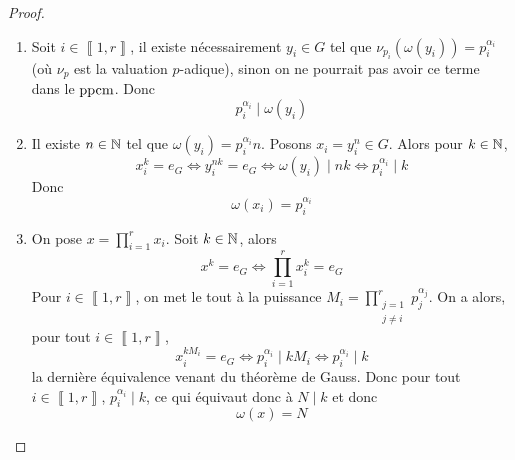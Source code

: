 \begin{proof}
	\phantom{}
	\begin{enumerate}
		\item Soit $i\in\left\llbracket 1,r\right\rrbracket$, il existe nécessairement $y_{i}\in G$ tel que $\nu_{p_{i}}(\omega(y_{i}))=p_{i}^{\alpha_{i}}$ (où $\nu_{p}$ est la valuation $p$-adique), sinon on ne pourrait pas avoir ce terme dans le $\operatorname{ppcm}$. Donc 
		\begin{equation}
			\boxed{p_{i}^{\alpha_{i}}\mid \omega(y_{i})}
		\end{equation}
		
		\item Il existe $n\in\mathbb{N}$ tel que $\omega(y_{i})=p_{i}^{\alpha_{i}}n$. Posons $x_{i}=y_{i}^{n}\in G$. Alors pour $k\in\mathbb{N}$,
		\begin{equation}
			x_{i}^{k}=e_{G}\Longleftrightarrow y_{i}^{nk}=e_{G}\Longleftrightarrow \omega(y_{i})\mid nk\Longleftrightarrow p_{i}^{\alpha_{i}}\mid k
		\end{equation}
		Donc 
		\begin{equation}
			\boxed{\omega(x_{i})=p_{i}^{\alpha_{i}}}
		\end{equation}

		\item On pose $x=\prod_{i=1}^{r}x_{i}$. Soit $k\in\mathbb{N}$, alors 
		\begin{equation}
			x^{k}=e_{G}\Longleftrightarrow \prod_{i=1}^{r}x_{i}^{k}=e_{G}
		\end{equation}
		Pour $i\in\left\llbracket 1,r\right\rrbracket$, on met le tout à la puissance $M_{i}=\prod_{\substack{j=1\\j\neq i}}^{r}p_{j}^{\alpha_{j}}$. On a alors, pour tout $i\in\left\llbracket 1,r\right\rrbracket$,
		\begin{equation}
			x_{i}^{kM_{i}}=e_{G}\Longleftrightarrow p_{i}^{\alpha_{i}}\mid kM_{i}\Longleftrightarrow p_{i}^{\alpha_{i}}\mid k
		\end{equation}
		la dernière équivalence venant du théorème de Gauss. Donc pour tout $i\in\left\llbracket 1,r\right\rrbracket$, $p_{i}^{\alpha_{i}}\mid k$, ce qui équivaut donc à $N\mid k$ et donc 
		\begin{equation}
			\boxed{\omega(x)=N}
		\end{equation}
	\end{enumerate}
\end{proof}

